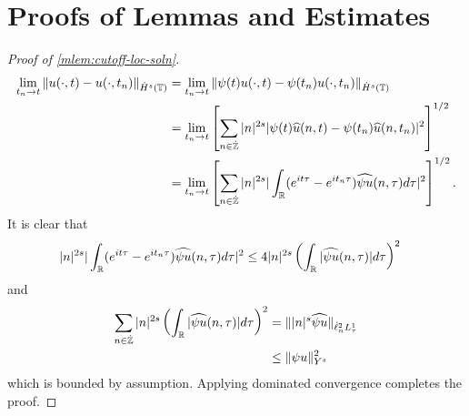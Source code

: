\section{Proofs of Lemmas and Estimates}
\begin{proof}[Proof of \cref{mlem:cutoff-loc-soln}]
%
%
\begin{equation*}
	\begin{split}
		\lim_{t_{n} \to t} \|u(\cdot, t) - u(\cdot, t_{n})\|_{\dot{H}^s(\mathbb{T})} 
		& = \lim_{t_{n} \to t} \|\psi(t) u(\cdot, t) - \psi(t_n) u(\cdot,
		t_{n})\|_{\dot{H}^s(\mathbb{T})} 
		\\
		& = \lim_{t_n \to t} \left[ \sum_{n \in \dot{\mathbb{Z}}}| n |
		^{2s} | \psi(t)  \widehat{u}(n, t) - \psi(t_n) \widehat{ u}(n, t_n) |^2 \right]^{1/2}
		\\
		& = \lim_{t_n \to t} \left[ \sum_{n \in \dot{\mathbb{Z}}} | n |^{2s} | \int_{\mathbb{R}} (e^{it \tau} - e^{it_{n} \tau}) \widehat{\psi u}(n,
		\tau) d \tau |^2 \right]^{1/2}.
	\end{split}
\end{equation*}
		It is clear that
		\begin{equation*}
			\begin{split}
				| n |
				^{2s} | \int_{\mathbb{R}} (e^{it \tau} - e^{it_{n}\tau}) \widehat{\psi u}(n, \tau) d \tau |^2 
		& \le 4  | n |^{2s} \left ( \int_{\mathbb{R}} |\widehat{\psi u}(n, \tau)| d \tau
		\right )^2 
	\end{split}
\end{equation*}
and 
%
%
\begin{equation*}
	\begin{split}
 \sum_{n \in \dot{\mathbb{Z}}} | n |^{2s} \left ( \int_{\mathbb{R}} |\widehat{\psi u}(n, \tau)| d \tau
		\right ) ^2 
		& = \| |n |^s \widehat{\psi u}\|_{\dot{\ell}_n^2 L_\tau^1}
		\\
		& \le \|\psi u \|_{Y^s}^2 
	\end{split}
\end{equation*}
which is bounded by assumption.
Applying dominated convergence completes the proof. 
\end{proof}
%
%
